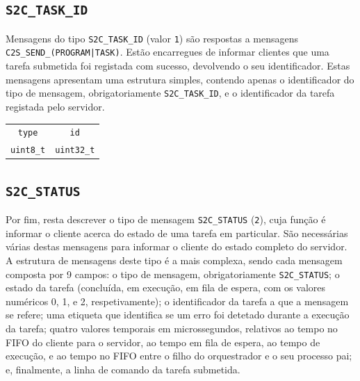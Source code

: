 \documentclass[11pt]{article}
\begin{document}
\subsection{\texttt{S2C\_TASK\_ID}}

Mensagens do tipo \texttt{S2C\_TASK\_ID} (valor \texttt{1}) são respostas a mensagens
\texttt{C2S\_SEND\_(PROGRAM|TASK)}. Estão encarregues de informar clientes que uma tarefa submetida
foi registada com sucesso, devolvendo o seu identificador. Estas mensagens apresentam uma estrutura
simples, contendo apenas o identificador do tipo de mensagem, obrigatoriamente
\texttt{S2C\_TASK\_ID}, e o identificador da tarefa registada pelo servidor.

\begin{center}
    \begin{tabular}{|c|c|}
        \hline
            \texttt{type}     & \texttt{id}       \\
            \texttt{uint8\_t} & \texttt{uint32\_t} \\
        \hline
    \end{tabular}
\end{center}

\subsection{\texttt{S2C\_STATUS}}

Por fim, resta descrever o tipo de mensagem \texttt{S2C\_STATUS} (\texttt{2}), cuja função é
informar o cliente acerca do estado de uma tarefa em particular. São necessárias várias destas
mensagens para informar o cliente do estado completo do servidor. A estrutura de mensagens deste
tipo é a mais complexa, sendo cada mensagem composta por 9 campos: o tipo de mensagem,
obrigatoriamente \texttt{S2C\_STATUS}; o estado da tarefa (concluída, em execução, em fila de
espera, com os valores numéricos 0, 1, e 2, respetivamente); o identificador da tarefa a que a
mensagem se refere; uma etiqueta que identifica se um erro foi detetado durante a execução da
tarefa; quatro valores temporais em microssegundos, relativos ao tempo no FIFO do cliente para o
servidor, ao tempo em fila de espera, ao tempo de execução, e ao tempo no FIFO entre o filho do
orquestrador e o seu processo pai; e, finalmente, a linha de comando da tarefa submetida. \\
\end{document}
